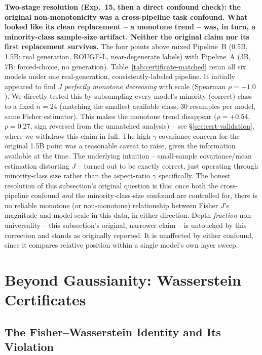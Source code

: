 \documentclass[onecolumn]{jmlr}
\begin{document}
\textbf{Two-stage resolution (Exp.~15, then a direct confound check):
the original non-monotonicity was a cross-pipeline task confound. What
looked like its clean replacement -- a monotone trend -- was, in turn, a
minority-class sample-size artifact. Neither the original claim nor its
first replacement survives.} The four points above mixed Pipeline~B
(0.5B, 1.5B: real generation, ROUGE-L, near-degenerate labels) with
Pipeline~A (3B, 7B: forced-choice, no generation). Table~\ref{tab:certificate-matched}
reran all six models under one real-generation, consistently-labeled
pipeline. It initially appeared to find $J$ \emph{perfectly monotone
decreasing} with scale (Spearman $\rho=-1.0$). We directly tested this
by subsampling every model's minority (correct) class to a fixed
$n=24$ (matching the smallest available class, 30 resamples per model,
same Fisher estimator). This makes the monotone trend disappear
($\rho=+0.54$, $p=0.27$, sign reversed from the unmatched analysis) --
see \S\ref{sec:cert-validation}, where we withdraw this claim in full.
The high-$\gamma$ covariance concern for the original 1.5B point was a
reasonable caveat to raise, given the information available at the
time. The underlying intuition -- small-sample covariance/mean
estimation distorting $J$ -- turned out to be exactly correct, just
operating through minority-class size rather than the aspect-ratio
$\gamma$ specifically. The honest resolution of this subsection's
original question is this: once both the cross-pipeline confound
\emph{and} the minority-class-size confound are controlled for, there
is no reliable monotone (or non-monotone) relationship between Fisher
$J$'s magnitude and model scale in this data, in either direction.
Depth \emph{fraction} non-universality -- this subsection's original,
narrower claim -- is untouched by this correction and stands as
originally reported. It is unaffected by either confound, since it
compares relative position within a single model's own layer sweep.

\FloatBarrier
\section{Beyond Gaussianity: Wasserstein Certificates}
\label{sec:ot}

\subsection{The Fisher--Wasserstein Identity and Its Violation}
\label{sec:ot-identity}
\end{document}
